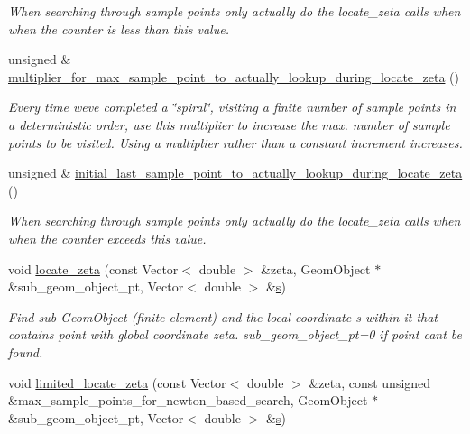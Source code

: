 \begin{DoxyCompactItemize}
\begin{DoxyCompactList}\small\item\em When searching through sample points only actually do the locate\+\_\+zeta calls when when the counter is less than this value. \end{DoxyCompactList}\item 
unsigned \& \hyperlink{classCGALSamplePointContainer_a52a64f338cef6e48a009564650608b4f}{multiplier\+\_\+for\+\_\+max\+\_\+sample\+\_\+point\+\_\+to\+\_\+actually\+\_\+lookup\+\_\+during\+\_\+locate\+\_\+zeta} ()
\begin{DoxyCompactList}\small\item\em Every time we\textquotesingle{}ve completed a \char`\"{}spiral\char`\"{}, visiting a finite number of sample points in a deterministic order, use this multiplier to increase the max. number of sample points to be visited. Using a multiplier rather than a constant increment increases. \end{DoxyCompactList}\item 
unsigned \& \hyperlink{classCGALSamplePointContainer_a6e348c02398a20868849874f793792a2}{initial\+\_\+last\+\_\+sample\+\_\+point\+\_\+to\+\_\+actually\+\_\+lookup\+\_\+during\+\_\+locate\+\_\+zeta} ()
\begin{DoxyCompactList}\small\item\em When searching through sample points only actually do the locate\+\_\+zeta calls when when the counter exceeds this value. \end{DoxyCompactList}\item 
void \hyperlink{classCGALSamplePointContainer_a059a8f0ebd74ffbc48722122b01e172b}{locate\+\_\+zeta} (const Vector$<$ double $>$ \&zeta, Geom\+Object $\ast$\&sub\+\_\+geom\+\_\+object\+\_\+pt, Vector$<$ double $>$ \&\hyperlink{cfortran_8h_ab7123126e4885ef647dd9c6e3807a21c}{s})
\begin{DoxyCompactList}\small\item\em Find sub-\/\+Geom\+Object (finite element) and the local coordinate s within it that contains point with global coordinate zeta. sub\+\_\+geom\+\_\+object\+\_\+pt=0 if point can\textquotesingle{}t be found. \end{DoxyCompactList}\item 
void \hyperlink{classCGALSamplePointContainer_a5bb7bc1e129ace75da7d5f128d964dac}{limited\+\_\+locate\+\_\+zeta} (const Vector$<$ double $>$ \&zeta, const unsigned \&max\+\_\+sample\+\_\+points\+\_\+for\+\_\+newton\+\_\+based\+\_\+search, Geom\+Object $\ast$\&sub\+\_\+geom\+\_\+object\+\_\+pt, Vector$<$ double $>$ \&\hyperlink{cfortran_8h_ab7123126e4885ef647dd9c6e3807a21c}{s})

\end{DoxyCompactItemize}
